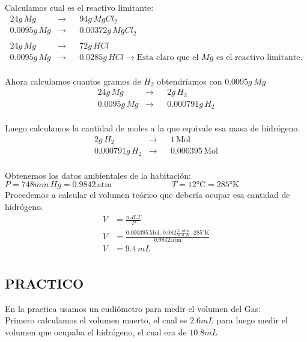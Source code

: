\documentclass[12pt]{report}
\begin{document}
Calculamos cual es el reactivo limitante:\\

$$
\begin{aligned}
    24g \, Mg &\rightarrow&& 94g \, MgCl_2 \\[6pt]
    0.0095g \, Mg &\rightarrow&& 0.00372g \, MgCl_2\\[6pt]
    \\
    24g \, Mg &\rightarrow&& 72g \, HCl \\[6pt]
    0.0095g \, Mg &\rightarrow&& 0.0285g \, HCl \rightarrow \text{Esta claro que el $Mg$ es el reactivo limitante.}\\[6pt]
\end{aligned}
$$

Ahora calculamos cuantos gramos de $H_2$ obtendríamos con $0.0095g \, Mg$ \\

$$
\begin{aligned}
    24g \, Mg &\rightarrow&& 2g \, H_2 \\[6pt]
    0.0095g \, Mg &\rightarrow&& 0.000791g \, H_2\\[6pt]
\end{aligned}
$$

Luego calculamos la cantidad de moles a la que equivale esa masa de hidrógeno.\\

$$
\begin{aligned}
    2g \, H_2  &\rightarrow&& 1 \, \text{Mol} \\[6pt]
    0.000791g \, H_2 &\rightarrow&& 0.000395 \,\text{Mol}  \\[6pt]
\end{aligned}
$$

Obtenemos los datos ambientales de la habitación:\\[6pt]
$P = 748mm \, Hg = 0.9842 \, \text{atm} \hspace{3cm} T= 12 \text{°C} = 285 \text{°K}$\\[6pt]
Procedemos a calcular el volumen teórico que debería ocupar esa cantidad de hidrógeno.\\

$$
\begin{aligned}
    V&=\frac{n . R . T}{P}\\[6pt]
    V&=\frac{0.000395 \, \text{Mol}\, . \, 0.082 \frac{L \, . atm}{\text{Mol} \, . K} \, . \, 285 \text{°K}}{0.9842 \, \text{atm}}\\[6pt]
    V&=9.4 \, mL\\[6pt]
\end{aligned}
$$

\subsection{PRACTICO}

En la practica usamos un eudiómetro para medir el volumen del Gas:\\

Primero calculamos el volumen muerto, el cual es $2.6mL$ para luego medir el volumen que ocupaba el hidrógeno, el cual era de $10.8mL$
\end{document}
